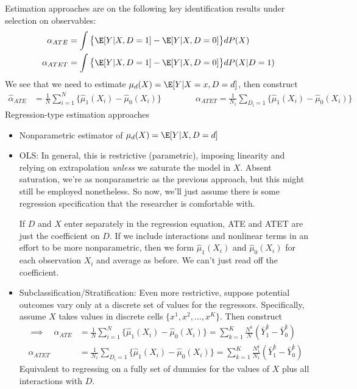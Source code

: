 \documentclass[12pt]{article}
\theoremstyle{plain}
\theoremstyle{definition}
\theoremstyle{remark}
\newcommand{\sumiN}{\sum^N_{i=1}}
\begin{document}
Estimation approaches are on the following key identification results
under selection on observables:
\begin{align*}
  \alpha_{ATE}
  &=
  \int
  \big\{
  \E[Y|X,D=1]
  -
  \E[Y|X,D=0]
  \big\}
  dP(X)
  \\
  \alpha_{ATET}
  &=
  \int
  \big\{
  \E[Y|X,D=1]
  -
  \E[Y|X,D=0]
  \big\}
  dP(X|D=1)
\end{align*}
We see that we need to estimate $\mu_d(X) = \E[Y|X=x,D=d]$,
then construct
\begin{align*}
  \hat{\alpha}_{ATE}
  &=
  \frac{1}{N}
  \sumiN
  \big\{
  \hat{\mu}_1(X_i)
  -
  \hat{\mu}_0(X_i)
  \big\}
  \qquad
  \qquad
  \alpha_{ATET}
  =
  \frac{1}{N_1}
  \sum_{D_i=1}
  \big\{
  \hat{\mu}_1(X_i)
  -
  \hat{\mu}_0(X_i)
  \big\}
\end{align*}
Regression-type estimation approaches
\begin{itemize}
  \item Nonparametric estimator of $\mu_d(X) = \E[Y|X,D=d]$
  \item OLS:
    In general, this is restrictive (parametric), imposing linearity and
    relying on extrapolation \emph{unless} we saturate the model in $X$.
    Absent saturation, we're as nonparametric as the previous approach,
    but this might still be employed nonetheless.
    So now, we'll just assume there is some regression specification
    that the researcher is comfortable with.

    If $D$ and $X$ enter separately in the regression equation, ATE and
    ATET are just the coefficient on $D$.
    If we include interactions and nonlinear terms in an effort to be
    more nonparametric, then we form $\hat{\mu}_1(X_i)$ and
    $\hat{\mu}_0(X_i)$ for each observation $X_i$ and average as before.
    We can't just read off the coefficient.

  \item Subclassification/Stratification:
    Even more restrictive, suppose potential outcomes vary only at a
    discrete set of values for the regressors.
    Specifically, assume $X$ takes values in discrete cells
    $\{x^1,x^2,\ldots,x^K\}$.
    Then construct
    \begin{align*}
      \implies\quad
      \hat{\alpha}_{ATE}
      &=
      \frac{1}{N}
      \sumiN
      \big\{
      \hat{\mu}_1(X_i)
      -
      \hat{\mu}_0(X_i)
      \big\}
      =
      \sum_{k=1}^K
      \frac{N^k}{N}
      (\bar{Y}^k_1-\bar{Y}^k_0)
      \\
      \alpha_{ATET}
      &=
      \frac{1}{N_1}
      \sum_{D_i=1}
      \big\{
      \hat{\mu}_1(X_i)
      -
      \hat{\mu}_0(X_i)
      \big\}
      =
      \sum_{k=1}^K
      \frac{N^k_1}{N_1}
      (\bar{Y}^k_1-\bar{Y}^k_0)
    \end{align*}
    Equivalent to regressing on a fully set of dummies for the
    values of $X$ plus all interactions with $D$.


\end{itemize}
\end{document}
